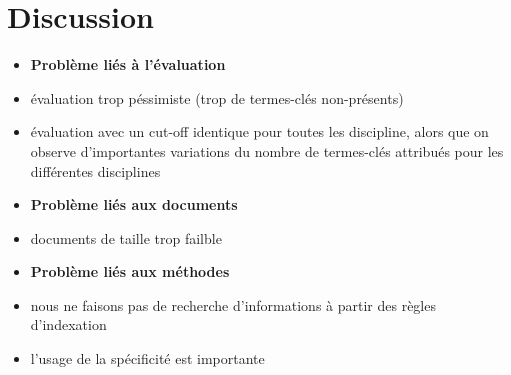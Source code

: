 \section{Discussion}
\label{sec:discussion}
  \begin{itemize}
    \item[]{\textbf{Problème liés à l'évaluation}}
    \item{évaluation trop péssimiste (trop de termes-clés non-présents)}
    \item{évaluation avec un cut-off identique pour toutes les discipline, alors
          que on observe d'importantes variations du nombre de termes-clés
          attribués pour les différentes disciplines}
    \item[]{\textbf{Problème liés aux documents}}
    \item{documents de taille trop failble}
    \item[]{\textbf{Problème liés aux méthodes}}
    \item{nous ne faisons pas de recherche d'informations à partir des règles
          d'indexation}
    \item{l'usage de la spécificité est importante}
  \end{itemize}

